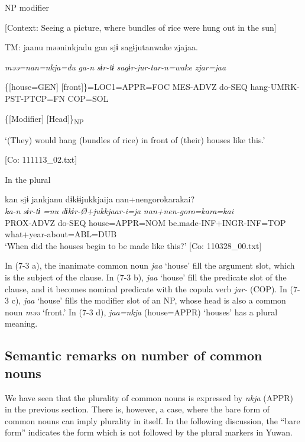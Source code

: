 \ex \label{ex:7:3c}NP modifier

    [Context: Seeing a picture, where bundles of rice were hung out in the sun]

    TM:  jaanu  məəninkjadu  gan  sjɨ   sagɨjutanwake  zjajaa.

      \textit{}  \textit{məə=nan=nkja=du}  \textit{ga-n}  \textit{sɨr-tɨ} \textit{sagɨr-jur-tar-n=wake}  \textit{zjar=jaa}
                                                                                
      \{[house=GEN]  [front]\}=LOC1=APPR=FOC  MES-ADVZ  do-SEQ                  hang-UMRK-PST-PTCP=FN  COP=SOL

      \{[Modifier]  [Head]\}\textsubscript{NP}    

      ‘(They) would hang (bundles of rice) in front of (their) houses like this.’

      [Co: 111113\_02.txt]

\ex \label{ex:7:3d}In the plural

\glll  kan  sjɨ  jankjanu  dɨkɨɨjukkjaija {\textbar}nan+nengoro{\textbar}karakai?\\
\textit{ka-n}  \textit{sɨr-tɨ}  \textit{=nu}  \textit{dɨkɨr-Ø+jukkjaar-i=ja}  \textit{nan+nen-goro=kara=kai}\\
PROX-ADVZ  do-SEQ  house=APPR=NOM  be.made-INF+INGR-INF=TOP  what+year-about=ABL=DUB\\
\glt ‘When did the houses begin to be made like this?’ [Co: 110328\_00.txt]
\z
\z

In (7-3 a), the inanimate common noun \textit{jaa} ‘house’ fill the argument slot, which is the subject of the clause. In (7-3 b), \textit{jaa} ‘house’ fill the predicate slot of the clause, and it becomes nominal predicate with the copula verb \textit{jar-} (COP). In (7-3 c), \textit{jaa} ‘house’ fills the modifier slot of an NP, whose head is also a common noun \textit{məə} ‘front.’ In (7-3 d), \textit{jaa=nkja} (house=APPR) ‘houses’ has a plural meaning.

\subsection{Semantic remarks on number of common nouns}

We have seen that the plurality of common nouns is expressed by \textit{nkja} (APPR) in the previous section. There is, however, a case, where the bare form of common nouns can imply plurality in itself. In the following discussion, the “bare form” indicates the form which is not followed by the plural markers in Yuwan.

